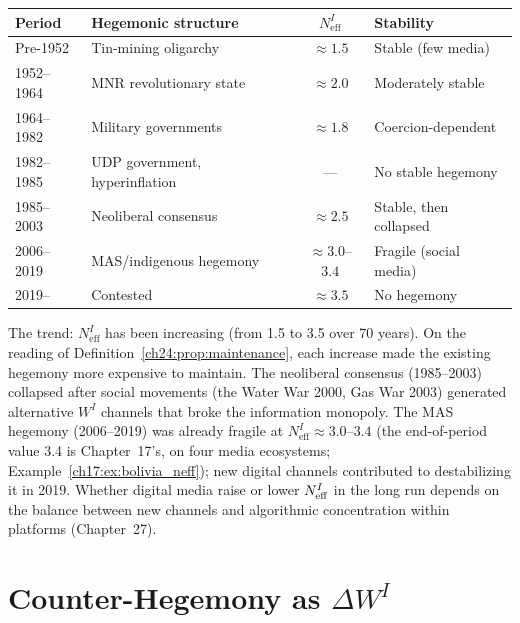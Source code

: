 \documentclass[../structural_economics_book.tex]{subfiles}
\begin{document}
\begin{example}\label{ch24:ex:bolivia_hegemony}
\begin{center}
\begin{tabular}{llcl}
\toprule
Period & Hegemonic structure & $N_{\text{eff}}^I$ & Stability \\
\midrule
Pre-1952 & Tin-mining oligarchy & $\approx 1.5$ & Stable (few media) \\
1952--1964 & MNR revolutionary state & $\approx 2.0$ & Moderately stable \\
1964--1982 & Military governments & $\approx 1.8$ & Coercion-dependent \\
1982--1985 & UDP government, hyperinflation & --- & No stable hegemony \\
1985--2003 & Neoliberal consensus & $\approx 2.5$ & Stable, then collapsed \\
2006--2019 & MAS/indigenous hegemony & $\approx 3.0$--$3.4$ & Fragile (social media) \\
2019-- & Contested & $\approx 3.5$ & No hegemony \\
\bottomrule
\end{tabular}
\end{center}

The trend: $N_{\text{eff}}^I$ has been increasing (from 1.5 to 3.5 over 70 years). On the reading of Definition~\ref{ch24:prop:maintenance}, each increase made the existing hegemony more expensive to maintain. The neoliberal consensus (1985--2003) collapsed after social movements (the Water War 2000, Gas War 2003) generated alternative $W^I$ channels that broke the information monopoly. The MAS hegemony (2006--2019) was already fragile at $N_{\text{eff}}^I \approx 3.0$--$3.4$ (the end-of-period value 3.4 is Chapter~17's, on four media ecosystems; Example~\ref{ch17:ex:bolivia_neff}); new digital channels contributed to destabilizing it in 2019. Whether digital media raise or lower $N_{\text{eff}}^I$ in the long run depends on the balance between new channels and algorithmic concentration within platforms (Chapter~27).
\end{example}


\section{Counter-Hegemony as $\Delta W^I$}
\label{ch24:sec:counter}
\end{document}
